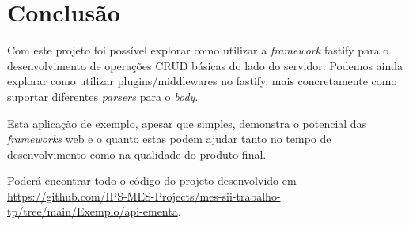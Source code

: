 \section{Conclusão} \label{section: conclusion}

Com este projeto foi possível explorar como utilizar a \textit{framework} fastify para o desenvolvimento de operações CRUD básicas do lado do servidor. Podemos ainda explorar como utilizar plugins/middlewares no fastify, mais concretamente como suportar diferentes \textit{parsers} para o \textit{body}.

Esta aplicação de exemplo, apesar que simples, demonstra o potencial das \textit{frameworks} web e o quanto estas podem ajudar tanto no tempo de desenvolvimento como na qualidade do produto final.

Poderá encontrar todo o código do projeto desenvolvido em \url{https://github.com/IPS-MES-Projects/mes-sii-trabalho-tp/tree/main/Exemplo/api-ementa}.
